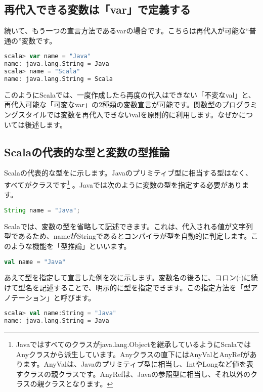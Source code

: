 \subsection{再代入できる変数は「var」で定義する}
続いて、もう一つの宣言方法であるvarの場合です。こちらは再代入が可能な“普通の”変数です。 

\begin{lstlisting}[language=scala, frame=none]
scala> var name = "Java"
name: java.lang.String = Java
scala> name = "Scala"
name: java.lang.String = Scala
\end{lstlisting}

このようにScalaでは、一度作成したら再度の代入はできない「不変なval」と、再代入可能な「可変なvar」の2種類の変数宣言が可能です。関数型のプログラミングスタイルでは変数を再代入できないvalを原則的に利用します。なぜかについては後述します。 

\subsection{Scalaの代表的な型と変数の型推論}
Scalaの代表的な型をに示します。Javaのプリミティブ型に相当する型はなく、すべてがクラスです\footnote{Javaではすべてのクラスがjava.lang.Objectを継承しているようにScalaではAnyクラスから派生しています。Anyクラスの直下にはAnyValとAnyRefがあります。AnyValは、Javaのプリミティブ型に相当し、IntやLongなど値を表すクラスの親クラスです。AnyRefは、Javaの参照型に相当し、それ以外のクラスの親クラスとなります。} 。Javaでは次のように変数の型を指定する必要があります。

\begin{lstlisting}[language=java, frame=none]
String name = "Java";
\end{lstlisting}

Scalaでは、変数の型を省略して記述できます。これは、代入される値が文字列型であるため、nameがStringであるとコンパイラが型を自動的に判定します。このような機能を「型推論」といいます。

\begin{lstlisting}[language=scala, frame=none]
val name = "Java"
\end{lstlisting}

あえて型を指定して宣言した例を次に示します。変数名の後ろに、コロン(:)に続けて型名を記述することで、明示的に型を指定できます。この指定方法を「型アノテーション」と呼びます。

\begin{lstlisting}[language=scala, frame=none]
scala> val name:String = "Java"
name: java.lang.String = Java
\end{lstlisting}

